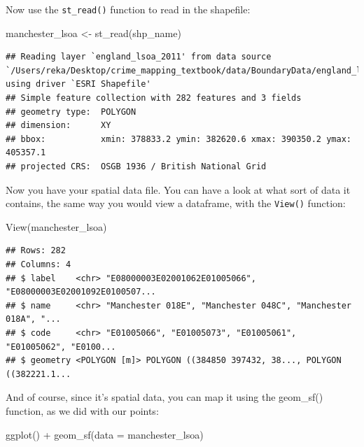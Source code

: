 \documentclass[
]{book}
\newenvironment{Shaded}{\begin{snugshade}}{\end{snugshade}}
\newcommand{\AttributeTok}[1]{\textcolor[rgb]{0.77,0.63,0.00}{#1}}
\newcommand{\FunctionTok}[1]{\textcolor[rgb]{0.00,0.00,0.00}{#1}}
\newcommand{\NormalTok}[1]{#1}
\newcommand{\OtherTok}[1]{\textcolor[rgb]{0.56,0.35,0.01}{#1}}
\newcommand{\SpecialCharTok}[1]{\textcolor[rgb]{0.00,0.00,0.00}{#1}}
\begin{document}
Now use the \texttt{st\_read()} function to read in the shapefile:

\begin{Shaded}
\begin{Highlighting}[]
\NormalTok{manchester\_lsoa }\OtherTok{\textless{}{-}} \FunctionTok{st\_read}\NormalTok{(shp\_name)}
\end{Highlighting}
\end{Shaded}

\begin{verbatim}
## Reading layer `england_lsoa_2011' from data source `/Users/reka/Desktop/crime_mapping_textbook/data/BoundaryData/england_lsoa_2011.shp' using driver `ESRI Shapefile'
## Simple feature collection with 282 features and 3 fields
## geometry type:  POLYGON
## dimension:      XY
## bbox:           xmin: 378833.2 ymin: 382620.6 xmax: 390350.2 ymax: 405357.1
## projected CRS:  OSGB 1936 / British National Grid
\end{verbatim}

Now you have your spatial data file. You can have a look at what sort of data it contains, the same way you would view a dataframe, with the \texttt{View()} function:

\begin{Shaded}
\begin{Highlighting}[]
\FunctionTok{View}\NormalTok{(manchester\_lsoa)}
\end{Highlighting}
\end{Shaded}

\begin{verbatim}
## Rows: 282
## Columns: 4
## $ label    <chr> "E08000003E02001062E01005066", "E08000003E02001092E0100507...
## $ name     <chr> "Manchester 018E", "Manchester 048C", "Manchester 018A", "...
## $ code     <chr> "E01005066", "E01005073", "E01005061", "E01005062", "E0100...
## $ geometry <POLYGON [m]> POLYGON ((384850 397432, 38..., POLYGON ((382221.1...
\end{verbatim}

And of course, since it's spatial data, you can map it using the geom\_sf() function, as we did with our points:

\begin{Shaded}
\begin{Highlighting}[]
\FunctionTok{ggplot}\NormalTok{() }\SpecialCharTok{+} 
  \FunctionTok{geom\_sf}\NormalTok{(}\AttributeTok{data =}\NormalTok{ manchester\_lsoa)}
\end{Highlighting}
\end{Shaded}
\end{document}
